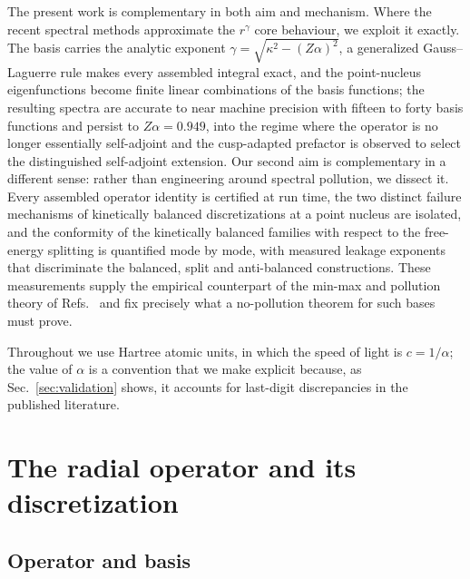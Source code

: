 \documentclass[aps,pra,twocolumn,superscriptaddress,showpacs,floatfix,longbibliography]{revtex4-2}
\newcommand{\Za}{\ensuremath{Z\alpha}}
\begin{document}
The present work is complementary in both aim and mechanism. Where the
recent spectral methods approximate the $r^{\gamma}$ core behaviour, we
exploit it exactly. The basis carries the analytic exponent
$\gamma=\sqrt{\kappa^{2}-(\Za)^{2}}$, a generalized Gauss--Laguerre rule
makes every assembled integral exact, and the point-nucleus
eigenfunctions become finite linear combinations of the basis functions;
the resulting spectra are accurate to near machine precision with fifteen
to forty basis functions and persist to $\Za=0.949$, into the regime
where the operator is no longer essentially self-adjoint and the
cusp-adapted prefactor is observed to select the distinguished
self-adjoint extension. Our second aim is complementary in a different
sense: rather than engineering around spectral pollution, we dissect it.
Every assembled operator identity is certified at run time, the two
distinct failure mechanisms of kinetically balanced discretizations at a
point nucleus are isolated, and the conformity of the kinetically
balanced families with respect to the free-energy splitting is quantified
mode by mode, with measured leakage exponents that discriminate the
balanced, split and anti-balanced constructions. These measurements
supply the empirical counterpart of the min-max and pollution theory of
Refs.~\cite{DES2000,MorozovMuller2015,LewinSere2010} and fix precisely
what a no-pollution theorem for such bases must prove.

Throughout we use Hartree atomic units, in which the speed of light is
$c=1/\alpha$; the value of $\alpha$ is a convention that we make explicit
because, as Sec.~\ref{sec:validation} shows, it accounts for last-digit
discrepancies in the published literature.

\section{The radial operator and its discretization}
\label{sec:method}

\subsection{Operator and basis}
\end{document}
